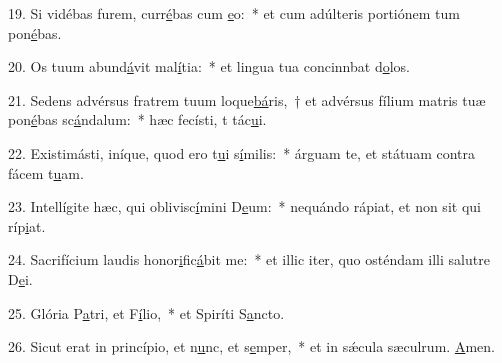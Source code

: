 19. Si vidébas furem, curr\uline{é}bas cum \uline{e}o:~* et cum adúlteris portiónem tum pon\uline{é}bas.\par 
20. Os tuum abund\uline{á}vit mal\uline{í}tia:~* et lingua tua concinnbat d\uline{o}los.\par 
21. Sedens advérsus fratrem tuum loque\uline{bá}ris,~† et advérsus fílium matris tuæ pon\uline{é}bas sc\uline{á}ndalum:~* hæc fecísti, t tác\uline{u}i.\par 
22. Existimásti, iníque, quod ero t\uline{u}i s\uline{í}milis:~* árguam te, et státuam contra fácem t\uline{u}am.\par 
23. Intellígite hæc, qui oblivisc\uline{í}mini D\uline{e}um:~* nequándo rápiat, et non sit qui ríp\uline{i}at.\par 
24. Sacrifícium laudis honor\uline{i}fic\uline{á}bit me:~* et illic iter, quo osténdam illi salutre D\uline{e}i.\par 
25. Glória P\uline{a}tri, et F\uline{í}lio,~* et Spiríti S\uline{a}ncto.\par 
26. Sicut erat in princípio, et n\uline{u}nc, et s\uline{e}mper,~* et in sǽcula sæculrum. \uline{A}men.\par 
